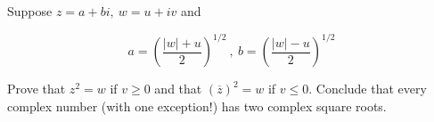 Suppose $z = a + bi,~w=u+iv$ and

$$a = \left( \dfrac{|w|+u}{2}\right)^{1/2} ~,~ b = \left( \dfrac{|w| - u}{2} \right)^{1/2}$$

Prove that $z^2 = w$ if $v \geq 0$ and that $(\overline{z})^2 = w$ if $v \leq 0$. Conclude that every complex number (with one exception!) has two complex square roots.


\begin{tcolorbox}
	\begin{solution}
		
	\end{solution}
\end{tcolorbox}